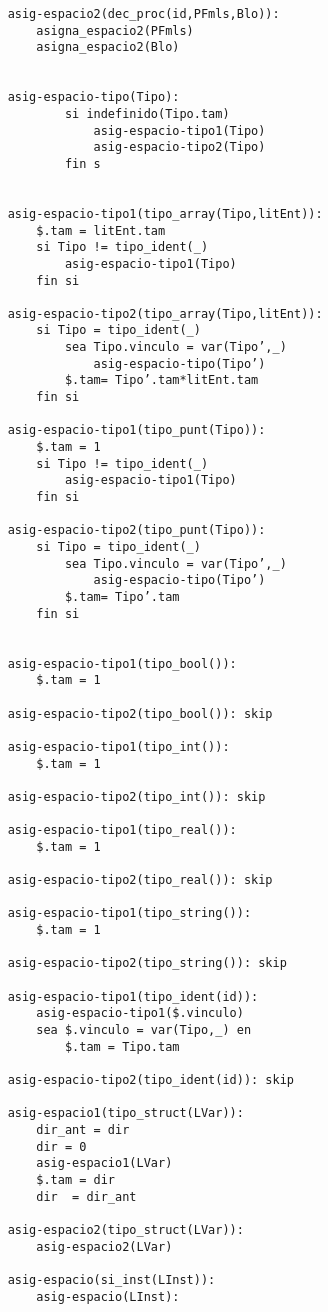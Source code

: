 \begin{lstlisting}
    asig-espacio2(dec_proc(id,PFmls,Blo)):
        asigna_espacio2(PFmls)
        asigna_espacio2(Blo) 
    
        
    asig-espacio-tipo(Tipo):
            si indefinido(Tipo.tam) 
                asig-espacio-tipo1(Tipo) 
                asig-espacio-tipo2(Tipo)
            fin s

            
    asig-espacio-tipo1(tipo_array(Tipo,litEnt)):
        $.tam = litEnt.tam
        si Tipo != tipo_ident(_)
            asig-espacio-tipo1(Tipo)
        fin si

    asig-espacio-tipo2(tipo_array(Tipo,litEnt)):
        si Tipo = tipo_ident(_)
            sea Tipo.vinculo = var(Tipo’,_)
                asig-espacio-tipo(Tipo’) 
            $.tam= Tipo’.tam*litEnt.tam
        fin si 

    asig-espacio-tipo1(tipo_punt(Tipo)):
        $.tam = 1
        si Tipo != tipo_ident(_)
            asig-espacio-tipo1(Tipo)
        fin si

    asig-espacio-tipo2(tipo_punt(Tipo)):
        si Tipo = tipo_ident(_)
            sea Tipo.vinculo = var(Tipo’,_)
                asig-espacio-tipo(Tipo’) 
            $.tam= Tipo’.tam
        fin si 
 

    asig-espacio-tipo1(tipo_bool()): 
        $.tam = 1

    asig-espacio-tipo2(tipo_bool()): skip

    asig-espacio-tipo1(tipo_int()): 
        $.tam = 1

    asig-espacio-tipo2(tipo_int()): skip

    asig-espacio-tipo1(tipo_real()): 
        $.tam = 1

    asig-espacio-tipo2(tipo_real()): skip

    asig-espacio-tipo1(tipo_string()): 
        $.tam = 1

    asig-espacio-tipo2(tipo_string()): skip

    asig-espacio-tipo1(tipo_ident(id)):
        asig-espacio-tipo1($.vinculo)
        sea $.vinculo = var(Tipo,_) en
            $.tam = Tipo.tam

    asig-espacio-tipo2(tipo_ident(id)): skip

    asig-espacio1(tipo_struct(LVar)):
        dir_ant = dir
        dir = 0
        asig-espacio1(LVar)
        $.tam = dir
        dir  = dir_ant

    asig-espacio2(tipo_struct(LVar)):
        asig-espacio2(LVar)

    asig-espacio(si_inst(LInst)):
        asig-espacio(LInst):


\end{lstlisting}
